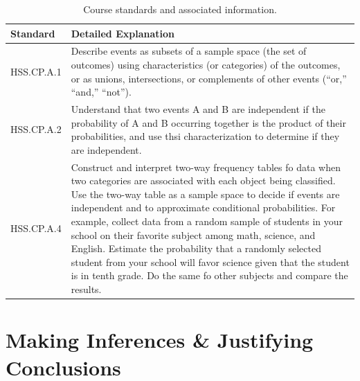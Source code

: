 \documentclass[12pt, oneside]{book}
\begin{document}
\begin{table}[h]
    \centering
    \caption{Course standards and associated information.}
    \vspace{0.3cm} %
    \begin{tabularx}{\textwidth}{l X} %
        \toprule
        \textbf{Standard} & \textbf{Detailed Explanation} \\
        \midrule
        HSS.CP.A.1 & Describe events as subsets of a sample space (the set of outcomes) using characteristics (or categories) of the outcomes, or as unions, intersections, or complements of other events (``or,'' ``and,'' ``not''). \\
        HSS.CP.A.2 & Understand that two events A and B are independent if the probability of A and B occurring together is the product of their probabilities, and use thsi characterization to determine if they are independent. \\
        HSS.CP.A.4 & Construct and interpret two-way frequency tables fo data when two categories are associated with each object being classified. Use the two-way table as a sample space to decide if events are independent and to approximate conditional probabilities. For example, collect data from a random sample of students in your school on their favorite subject among math, science, and English. Estimate the probability that a randomly selected student from your school will favor science given that the student is in tenth grade. Do the same fo other subjects and compare the results. \\
        \bottomrule
    \end{tabularx}
\end{table}

\chapter{Making Inferences \& Justifying Conclusions}
\end{document}
